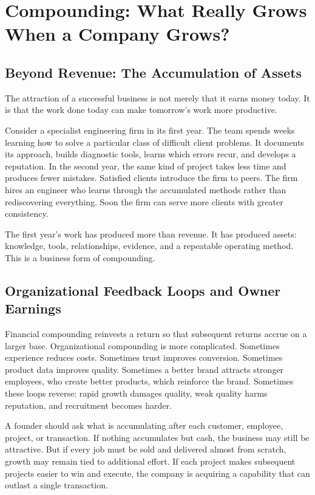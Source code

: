 \section{Compounding: What Really Grows When a Company Grows?}

\subsection{Beyond Revenue: The Accumulation of Assets}

The attraction of a successful business is not merely that it earns money today. It is that the work done today can make tomorrow's work more productive.

Consider a specialist engineering firm in its first year. The team spends weeks learning how to solve a particular class of difficult client problems. It documents its approach, builds diagnostic tools, learns which errors recur, and develops a reputation. In the second year, the same kind of project takes less time and produces fewer mistakes. Satisfied clients introduce the firm to peers. The firm hires an engineer who learns through the accumulated methods rather than rediscovering everything. Soon the firm can serve more clients with greater consistency.

The first year's work has produced more than revenue. It has produced assets: knowledge, tools, relationships, evidence, and a repeatable operating method. This is a business form of compounding.

\subsection{Organizational Feedback Loops and Owner Earnings}

Financial compounding reinvests a return so that subsequent returns accrue on a larger base. Organizational compounding is more complicated. Sometimes experience reduces costs. Sometimes trust improves conversion. Sometimes product data improves quality. Sometimes a better brand attracts stronger employees, who create better products, which reinforce the brand. Sometimes these loops reverse: rapid growth damages quality, weak quality harms reputation, and recruitment becomes harder.

A founder should ask what is accumulating after each customer, employee, project, or transaction. If nothing accumulates but cash, the business may still be attractive. But if every job must be sold and delivered almost from scratch, growth may remain tied to additional effort. If each project makes subsequent projects easier to win and execute, the company is acquiring a capability that can outlast a single transaction.

